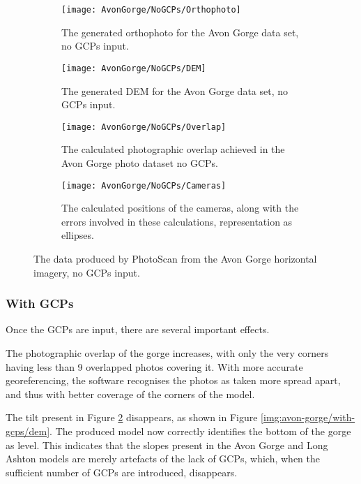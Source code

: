 \begin{figure}
    \centering
    \begin{subfigure}[b]{0.24\textwidth}
        \texttt{[image: AvonGorge/NoGCPs/Orthophoto]}
        \caption{The generated orthophoto for the Avon Gorge data set, no
        GCPs input.}
        \label{img:avon-gorge/no-gcps/orthophoto}
    \end{subfigure}
    \begin{subfigure}[b]{0.24\textwidth}
        \texttt{[image: AvonGorge/NoGCPs/DEM]}
        \caption{The generated DEM for the Avon Gorge data set, no GCPs input.}
        \label{img:avon-gorge/no-gcps/dem}
    \end{subfigure}
    \begin{subfigure}[b]{0.24\textwidth}
        \texttt{[image: AvonGorge/NoGCPs/Overlap]}
        \caption{The calculated photographic overlap achieved in the Avon Gorge
        photo dataset no GCPs.}
        \label{img:avon-gorge/no-gcps/overlap}
    \end{subfigure}
    \begin{subfigure}[b]{0.24\textwidth}
        \texttt{[image: AvonGorge/NoGCPs/Cameras]}
        \caption{The calculated positions of the cameras, along with the errors
        involved in these calculations, representation as ellipses.}
        \label{img:avon-gorge/no-gcps/cameras}
    \end{subfigure}
    \caption{The data produced by PhotoScan from the Avon Gorge horizontal
    imagery, no GCPs input.}
    \label{img:avon-gorge/no-gcps}
\end{figure}

\subsubsection{With GCPs}
\label{sec:results/avon-gorge/with-gcps}

Once the GCPs are input, there are several important effects.

The photographic overlap of the gorge increases, with only the very corners
having less than 9 overlapped photos covering it. With more accurate
georeferencing, the software recognises the photos as taken more spread apart,
and thus with better coverage of the corners of the model.

The tilt present in Figure \ref{img:avon-gorge/no-gcps/dem} disappears, as shown
in Figure \ref{img:avon-gorge/with-gcps/dem}. The produced model now correctly
identifies the bottom of the gorge as level. This indicates that the slopes
present in the Avon Gorge and Long Ashton models are merely artefacts of the
lack of GCPs, which, when the sufficient number of GCPs are introduced,
disappears.

